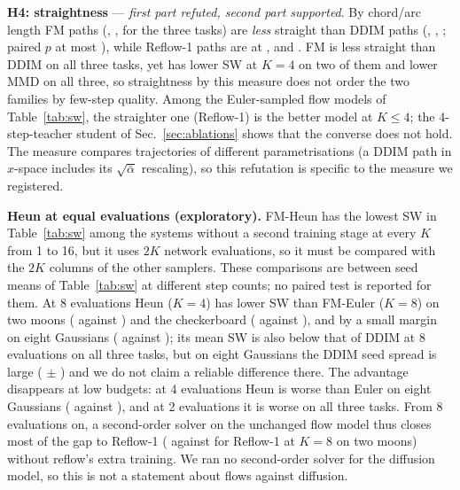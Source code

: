 \textbf{H4: straightness} --- \emph{first part refuted, second part supported}. By chord/arc length FM paths (, ,  for the three tasks) are \emph{less} straight than DDIM paths (, , ; paired $p$ at most ), while Reflow-1 paths are at ,  and . FM is less straight than DDIM on all three tasks, yet has lower SW at $K{=}4$ on two of them and lower MMD on all three, so straightness by this measure does not order the two families by few-step quality. Among the Euler-sampled flow models of Table~\ref{tab:sw}, the straighter one (Reflow-1) is the better model at $K\le4$; the 4-step-teacher student of Sec.~\ref{sec:ablations} shows that the converse does not hold. The measure compares trajectories of different parametrisations (a DDIM path in $x$-space includes its $\sqrt{\bar\alpha}$ rescaling), so this refutation is specific to the measure we registered.

\textbf{Heun at equal evaluations (exploratory).} FM-Heun has the lowest SW in Table~\ref{tab:sw} among the systems without a second training stage at every $K$ from 1 to 16, but it uses $2K$ network evaluations, so it must be compared with the $2K$ columns of the other samplers. These comparisons are between seed means of Table~\ref{tab:sw} at different step counts; no paired test is reported for them. At 8 evaluations Heun ($K{=}4$) has lower SW than FM-Euler ($K{=}8$) on two moons ( against ) and the checkerboard ( against ), and by a small margin on eight Gaussians ( against ); its mean SW is also below that of DDIM at 8 evaluations on all three tasks, but on eight Gaussians the DDIM seed spread is large ( $\pm$ ) and we do not claim a reliable difference there. The advantage disappears at low budgets: at 4 evaluations Heun is worse than Euler on eight Gaussians ( against ), and at 2 evaluations it is worse on all three tasks. From 8 evaluations on, a second-order solver on the unchanged flow model thus closes most of the gap to Reflow-1 ( against  for Reflow-1 at $K{=}8$ on two moons) without reflow's extra training. We ran no second-order solver for the diffusion model, so this is not a statement about flows against diffusion.
